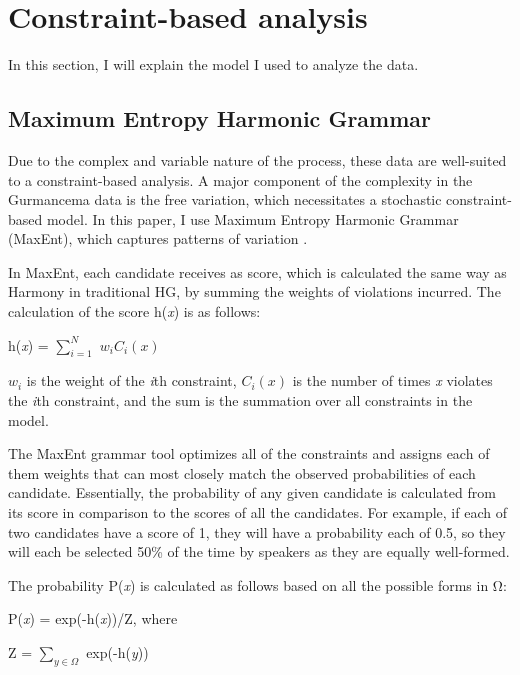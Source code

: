 \documentclass[output=paper,newtxmath,modfonts,nonflat,draftmode]{langsci/langscibook}
\begin{document}
\section{Constraint-based analysis}
In this section, I will explain the model I used to analyze the data. 

\subsection{Maximum Entropy Harmonic Grammar}

Due to the complex and variable nature of the process, these data are well-suited to a constraint-based analysis. A major component of the complexity in the Gurmancema data is the free variation, which necessitates a stochastic constraint-based model. In this paper, I use Maximum Entropy Harmonic Grammar (MaxEnt), which captures patterns of variation \citep{GoldwaterJohnson2003,HayesWilson2008}. 
	 
In MaxEnt, each candidate receives as score, which is calculated the same way as Harmony in traditional HG, by summing the weights of violations incurred. The calculation of the score h(\textit{x}) is as follows: 

\ea
h(\textit{x}) = $\sum_{\textit{i}=1}^{\textit{N}}$ ${w_i}{C_i}(x)$

\z

${w_i}$ is the weight of the \textit{i}th constraint, ${C_i}(x)$ is the number of times \textit{x} violates the \textit{i}th constraint, and the sum is the summation over all constraints in the model.  

The MaxEnt grammar tool \citep{WilsonEtAl2009} optimizes all of the constraints and assigns each of them weights that can most closely match the observed probabilities of each candidate. Essentially, the probability of any given candidate is calculated from its score in comparison to the scores of all the candidates. For example, if each of two candidates have a score of 1, they will have a probability each of 0.5, so they will each be selected 50\% of the time by speakers as they are equally well-formed.

The probability P(\textit{x}) is calculated as follows based on all the possible forms in Ω:

\ea

P(\textit{x}) = exp(-h(\textit{x}))/Z, where \newline

Z = $\sum_{y\in \varOmega}$ exp(-h(\textit{y}))
\z
\end{document}
